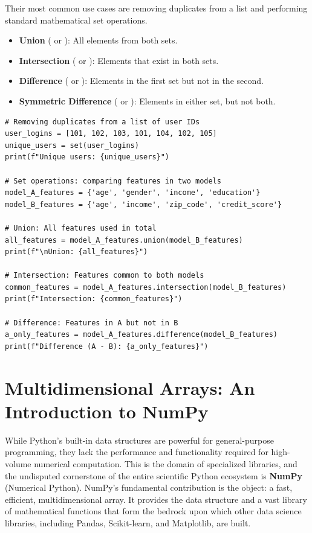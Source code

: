Their most common use cases are removing duplicates from a list and performing standard mathematical set operations.

\begin{itemize}
    \item \textbf{Union} (\code{|_} or ): All elements from both sets.
    \item \textbf{Intersection} (\code{&_} or ): Elements that exist in both sets.
    \item \textbf{Difference} (\code{-_} or ): Elements in the first set but not in the second.
    \item \textbf{Symmetric Difference} (\code{^_} or ): Elements in either set, but not both.
\end{itemize}

\begin{example}
\text{ }\begin{verbatim}
# Removing duplicates from a list of user IDs
user_logins = [101, 102, 103, 101, 104, 102, 105]
unique_users = set(user_logins)
print(f"Unique users: {unique_users}")

# Set operations: comparing features in two models
model_A_features = {'age', 'gender', 'income', 'education'}
model_B_features = {'age', 'income', 'zip_code', 'credit_score'}

# Union: All features used in total
all_features = model_A_features.union(model_B_features)
print(f"\nUnion: {all_features}")

# Intersection: Features common to both models
common_features = model_A_features.intersection(model_B_features)
print(f"Intersection: {common_features}")

# Difference: Features in A but not in B
a_only_features = model_A_features.difference(model_B_features)
print(f"Difference (A - B): {a_only_features}")
\end{verbatim}
\end{example}


\section{Multidimensional Arrays: An Introduction to NumPy}
\label{sec:numpy_intro}
While Python's built-in data structures are powerful for general-purpose programming, they lack the performance and functionality required for high-volume numerical computation. This is the domain of specialized libraries, and the undisputed cornerstone of the entire scientific Python ecosystem is \textbf{NumPy} (Numerical Python). NumPy's fundamental contribution is the \textbf{} object: a fast, efficient, multidimensional array. It provides the data structure and a vast library of mathematical functions that form the bedrock upon which other data science libraries, including Pandas, Scikit-learn, and Matplotlib, are built.

